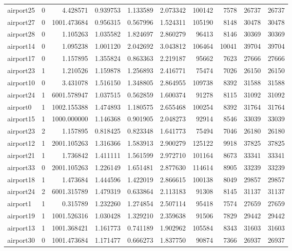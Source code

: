 \begin{longtable}{|l|r|r|r|r|r|r|r|r|r|}
airport25 & 0 & 4.428571 & 0.939753 & 1.133589 & 2.073342 & 100142 & 7578 & 26737 & 26737 \\
airport27 & 0 & 1001.473684 & 0.956315 & 0.567996 & 1.524311 & 105190 & 8148 & 30478 & 30478 \\
airport28 & 0 & 1.105263 & 1.035582 & 1.824697 & 2.860279 & 96413 & 8146 & 30369 & 30369 \\
airport14 & 0 & 1.095238 & 1.001120 & 2.042692 & 3.043812 & 106464 & 10041 & 39704 & 39704 \\
airport17 & 0 & 1.157895 & 1.355824 & 0.863363 & 2.219187 & 95662 & 7623 & 27666 & 27666 \\
airport23 & 1 & 1.210526 & 1.159878 & 1.256893 & 2.416771 & 75474 & 7026 & 26150 & 26150 \\
airport10 & 0 & 3.431078 & 1.516150 & 1.348805 & 2.864955 & 109738 & 8392 & 31588 & 31588 \\
airport24 & 1 & 6001.578947 & 1.037515 & 0.562859 & 1.600374 & 91278 & 8115 & 31092 & 31092 \\
airport0 & 1 & 1002.155388 & 1.474893 & 1.180575 & 2.655468 & 100254 & 8392 & 31764 & 31764 \\
airport15 & 1 & 1000.000000 & 1.146368 & 0.901905 & 2.048273 & 92914 & 8546 & 33039 & 33039 \\
airport23 & 2 & 1.157895 & 0.818425 & 0.823348 & 1.641773 & 75494 & 7046 & 26180 & 26180 \\
airport12 & 1 & 2001.105263 & 1.316366 & 1.583913 & 2.900279 & 125122 & 9918 & 37825 & 37825 \\
airport21 & 1 & 1.736842 & 1.411111 & 1.561599 & 2.972710 & 101164 & 8673 & 33341 & 33341 \\
airport33 & 0 & 2001.105263 & 1.226149 & 1.651481 & 2.877630 & 114614 & 8905 & 33239 & 33239 \\
airport18 & 1 & 1.473684 & 1.444596 & 1.422019 & 2.866615 & 100138 & 8049 & 29857 & 29857 \\
airport24 & 2 & 6001.315789 & 1.479319 & 0.633864 & 2.113183 & 91308 & 8145 & 31137 & 31137 \\
airport1 & 1 & 0.315789 & 1.232260 & 1.274854 & 2.507114 & 95418 & 7574 & 27659 & 27659 \\
airport19 & 1 & 1001.526316 & 1.030428 & 1.329210 & 2.359638 & 91506 & 7829 & 29442 & 29442 \\
airport13 & 1 & 1001.368421 & 1.161773 & 0.741189 & 1.902962 & 105584 & 8343 & 31603 & 31603 \\
airport30 & 0 & 1001.473684 & 1.171477 & 0.666273 & 1.837750 & 90874 & 7366 & 26937 & 26937 \\

\end{longtable}
